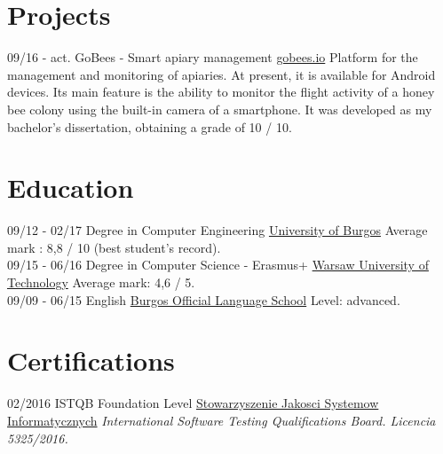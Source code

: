 \documentclass[]{friggeri-cv}
\begin{document}
\section{Projects}
\begin{entrylist}
  \entry
    {09/16 - act.}
    {GoBees - Smart apiary management}
    {\href{http://gobees.io/}{gobees.io}}
    {Platform for the management and monitoring of apiaries. At present, it is available for Android devices. Its main feature is the ability to monitor the flight activity of a honey bee colony using the built-in camera of a smartphone. It was developed as my bachelor's dissertation, obtaining a grade of 10 / 10.}
\end{entrylist}

\section{Education}
\begin{entrylist}
  \entry
    {09/12 - 02/17}
    {Degree in Computer Engineering}
    {\href{http://wwww.ubu.es/}{University of Burgos}}
    {Average mark : 8,8 / 10 (best student’s record).\\}
  \entry
    {09/15 - 06/16}
    {Degree in Computer Science - Erasmus+}
    {\href{https://www.pw.edu.pl/}{Warsaw University of Technology}}
    {Average mark: 4,6 / 5.\\}
  \entry
    {09/09 - 06/15}
    {English}
    {\href{http://eoiburgos.centros.educa.jcyl.es/}{Burgos Official Language School}}
    {Level: advanced.\\}
\end{entrylist}

\section{Certifications}
\begin{entrylist}
  \entry
    {02/2016}
    {ISTQB Foundation Level}
    {\href{http://sjsi.org/}{Stowarzyszenie Jakosci Systemow Informatycznych}}
    {\emph{International Software Testing Qualifications Board. Licencia 5325/2016.}}
\end{entrylist}

\newpage
\end{document}
